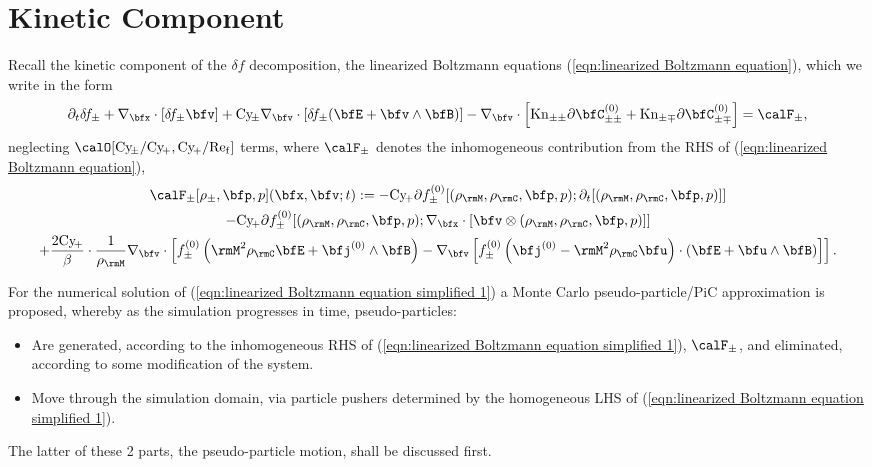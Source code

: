 \chapter{Kinetic Component}\label{cha:kinetic component}
    Recall the kinetic component of the $\delta\!f$ decomposition, the linearized Boltzmann equations (\ref{eqn:linearized Boltzmann equation}), which we write in the form
    \begin{equation}\label{eqn:linearized Boltzmann equation simplified 1}
        \partial_{t}\delta\!f_{\pm}
        + \nabla_{\bfx}\cdot[\delta\!f_{\pm}\bfv]
        + \rmCy\!_{\pm}\nabla_{\bfv}\cdot[\delta\!f_{\pm}(\bfE + \bfv\wedge\bfB)]
        - \nabla_{\bfv}\cdot\left[\rmKn_{\pm\pm}\partial\bfC_{\pm\pm}^{(0)} + \rmKn_{\pm\mp}\partial\bfC_{\pm\mp}^{(0)}\right]
        =  \calF_{\pm},
    \end{equation}
    neglecting $\calO[\rmCy\!_{\pm}/\rmCy\!_{+}, \rmCy\!_{+}/\rmRef]$ terms, where $\calF_{\pm}$ denotes the inhomogeneous contribution from the RHS of (\ref{eqn:linearized Boltzmann equation}),
    \begin{multline}\label{eqn:inhomogeneous RHS}
        \calF_{\pm}[\rho_{\pm}, \bfp, p](\bfx, \bfv; t)
        :=  - \rmCy\!_{+}\partial f_{\pm}^{(0)}[(\rho_{\rmM}, \rho_{\rmC}, \bfp, p); \partial_{t}[(\rho_{\rmM}, \rho_{\rmC}, \bfp, p)]]  \\
        - \rmCy\!_{+}\partial f_{\pm}^{(0)}[(\rho_{\rmM}, \rho_{\rmC}, \bfp, p); \nabla_{\bfx}\cdot[\bfv\otimes(\rho_{\rmM}, \rho_{\rmC}, \bfp, p)]]  \\
        + \frac{2\rmCy\!_{+}}{\beta}\cdot\frac{1}{\rho_{\rmM}}\nabla_{\bfv}\cdot\left[f_{\pm}^{(0)}\left(\rmM^{2}\rho_{\rmC}\bfE + \bfj^{(0)}\wedge\bfB\right) - \nabla_{\bfv}\left[f_{\pm}^{(0)}\left(\bfj^{(0)} - \rmM^{2}\rho_{\rmC}\bfu\right)\cdot\left(\bfE + \bfu\wedge\bfB\right)\right]\right].
    \end{multline}

    For the numerical solution of (\ref{eqn:linearized Boltzmann equation simplified 1}) a Monte Carlo pseudo-particle/PiC approximation is proposed, whereby as the simulation progresses in time, pseudo-particles:
    \begin{itemize}
        \item  Are generated, according to the inhomogeneous RHS of (\ref{eqn:linearized Boltzmann equation simplified 1}), $\calF_{\pm}$, and eliminated, according to some modification of the system.
        \item  Move through the simulation domain, via particle pushers determined by the homogeneous LHS of (\ref{eqn:linearized Boltzmann equation simplified 1}).
    \end{itemize}
    The latter of these 2 parts, the pseudo-particle motion, shall be discussed first.


    
    
    